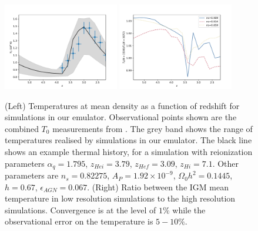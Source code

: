 \documentclass[a4paper,11pt]{article}
\begin{document}
\begin{figure}
\includegraphics[width=0.45\textwidth]{figures/mean-temperature.pdf}
\includegraphics[width=0.45\textwidth]{figures/mean-temperature-resolution.pdf}
 \caption{(Left) Temperatures at mean density as a function of redshift for simulations in our emulator. Observational points shown are the combined $T_0$ measurements from \protect\cite{Gaikwad:2021}.  The grey band shows the range of temperatures realised by simulations in our emulator. The black line shows an example thermal history, for a simulation with reionization parameters $\alpha_q = 1.795$, $z_{Hei} = 3.79$, $z_{Hef} = 3.09$, $z_{Hi} = 7.1$. Other parameters are $n_s = 0.82275$, $A_P = 1.92 \times 10^{-9}$, $\Omega_0 h^2 = 0.1445$, $h = 0.67$, $\epsilon_{AGN} = 0.067$.
 (Right) Ratio between the IGM mean temperature in low resolution simulations to the high resolution simulations. Convergence is at the level of $1\%$ while the observational error on the temperature is $5-10\%$.
}
 \label{fig:meanigmtempdens}
\end{figure}
\end{document}
